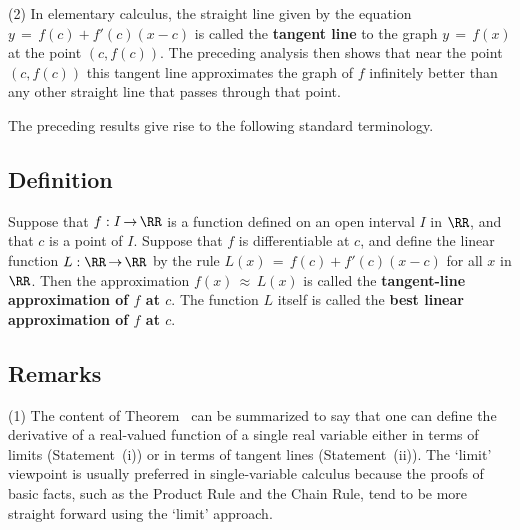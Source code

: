 \V

        (2) In elementary calculus, the straight line given by the equation $y \,=\, f(c) + f'(c)(x-c)$ is called the {\bf tangent line} to the graph $y \,=\, f(x)$ at the point $(c,f(c))$.
    The preceding analysis then shows that near the point $(c,f(c))$ this tangent line approximates the graph of $f$ infinitely better than any other straight line that passes through that point.

\V

        The preceding results give rise to the following standard terminology.

\V

             \subsection{\small{\bf Definition}}
            \label{DefE55.35}

\V

        Suppose that $f:I \,{\rightarrow}\, {\RR}$ is a function defined on an open interval $I$ in ${\RR}$, and that $c$ is a point of $I$.
    Suppose that $f$ is differentiable at $c$, and define the linear function $L:{\RR} \,{\rightarrow}\, {\RR}$ by the rule $L(x) \,=\, f(c) + f'(c)(x-c)$ for all $x$ in ${\RR}$.
    Then the approximation $f(x) \,{\approx}\, L(x)$ is called the {\bf tangent-line approximation of $f$ at $c$}.
    The function $L$ itself is called the {\bf best linear approximation of $f$ at $c$}.


\V
\V


             \subsection{\small{\bf Remarks}}
            \label{RemrkE55.37}

\V


\hspace*{\parindent}(1) The content of Theorem~ can be summarized to say that  one can define the derivative of a real-valued function of a single real variable either in terms of limits (Statement~(i)) or in terms of tangent lines (Statement~(ii)).
    The `limit' viewpoint is usually preferred in single-variable calculus because the proofs of basic facts, such as the Product Rule and the Chain Rule,
    tend to be more straight forward using the `limit' approach.


